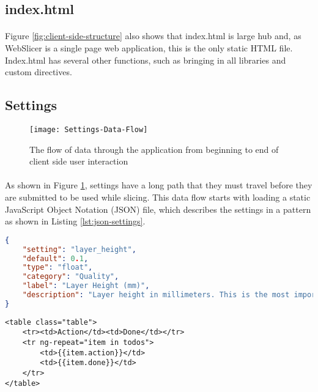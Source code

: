 \subsection{index.html}%
\paragraph{}
Figure \ref{fig:client-side-structure} also shows that index.html is large hub and, as WebSlicer is a single page web application, this is the only static HTML file.
Index.html has several other functions, such as bringing in all libraries and custom directives.

\subsection{Settings}%
\begin{figure}[!ht]
  \centering
  \texttt{[image: Settings-Data-Flow]}
  \caption{The flow of data through the application from beginning to end of client side user interaction}
  \label{fig:settings-data-flow}
\end{figure}
\paragraph{}
As shown in Figure \ref{fig:settings-data-flow}, settings have a long path that they must travel before they are submitted to be used while slicing. 
This data flow starts with loading a static JavaScript Object Notation (JSON) file, which describes the settings in a pattern as shown in Listing \ref{lst:json-settings}.

\begin{lstlisting}[language=json, label={lst:json-settings}, caption=A sample from a static settings file in JSON format.]
{
    "setting": "layer_height",
    "default": 0.1,
    "type": "float",
    "category": "Quality",
    "label": "Layer Height (mm)",
    "description": "Layer height in millimeters. This is the most important setting to determine the quality of your print. Normal quality prints are 0.1mm, high quality is 0.06mm. You can go up to 0.25mm."
}
\end{lstlisting}

\begin{lstlisting}[language=HTML5, label={lst:html-repeat-example}, caption=An example of a ng-repeat looping construct in HTML5.]
<table class="table">
	<tr><td>Action</td><td>Done</td></tr>
	<tr ng-repeat="item in todos">
		<td>{{item.action}}</td>
		<td>{{item.done}}</td>
	</tr>
</table>
\end{lstlisting}

